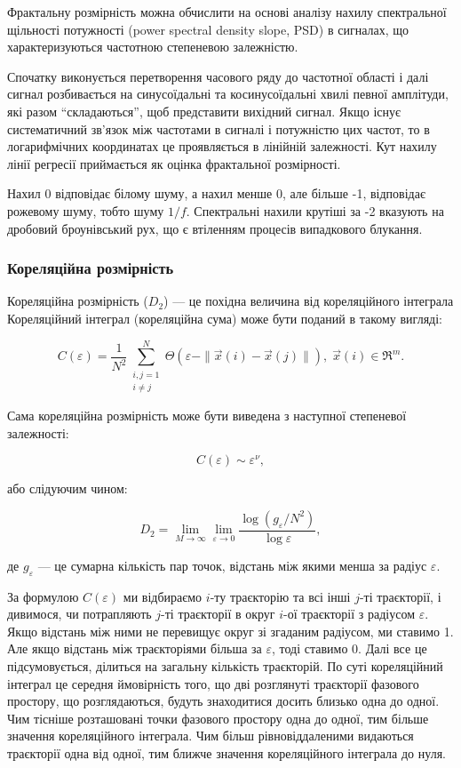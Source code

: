 \documentclass[
  letterpaper,
]{report}
\begin{document}
Фрактальну розмірність можна обчислити на основі аналізу нахилу
спектральної щільності потужності (power spectral density slope, PSD) в
сигналах, що характеризуються частотною степеневою залежністю.

Спочатку виконується перетворення часового ряду до частотної області і
далі сигнал розбивається на синусоїдальні та косинусоїдальні хвилі
певної амплітуди, які разом ``складаються'', щоб представити вихідний
сигнал. Якщо існує систематичний зв'язок між частотами в сигналі і
потужністю цих частот, то в логарифмічних координатах це проявляється в
лінійній залежності. Кут нахилу лінії регресії приймається як оцінка
фрактальної розмірності.

Нахил 0 відповідає білому шуму, а нахил менше 0, але більше -1,
відповідає рожевому шуму, тобто шуму \(1/f\). Спектральні нахили крутіші
за -2 вказують на дробовий броунівський рух, що є втіленням процесів
випадкового блукання.

\hypertarget{ux43aux43eux440ux435ux43bux44fux446ux456ux439ux43dux430-ux440ux43eux437ux43cux456ux440ux43dux456ux441ux442ux44c}{%
\subsubsection{Кореляційна
розмірність}\label{ux43aux43eux440ux435ux43bux44fux446ux456ux439ux43dux430-ux440ux43eux437ux43cux456ux440ux43dux456ux441ux442ux44c}}

Кореляційна розмірність (\(D_2\)) --- це похідна величина від
кореляційного інтеграла Кореляційний інтеграл (кореляційна сума) може
бути поданий в такому вигляді:

\[
C(\varepsilon) = \frac{1}{N^{2}}\sum_{\substack{i,j=1 \\ i\neq j}}^{N}\Theta \left( \varepsilon - \| \vec{x}(i) - \vec{x}(j) \| \right), \; \vec{x}(i) \in \Re^{m}. 
\]

Сама кореляційна розмірність може бути виведена з наступної степеневої
залежності:

\[
C(\varepsilon) \sim \varepsilon^{\nu}, 
\]

або слідуючим чином:

\[
D_2 = \lim_{M\to\infty}\lim_{\varepsilon\to 0}\frac{\log{\left( g_{\varepsilon}/N^2 \right)}}{\log{\varepsilon}}, 
\]

де \(g_{\varepsilon}\) --- це сумарна кількість пар точок, відстань між
якими менша за радіус \(\varepsilon\).

За формулою \(C(\varepsilon)\) ми відбираємо \(i\)-ту траєкторію та всі
інші \(j\)-ті траєкторії, і дивимося, чи потрапляють \(j\)-ті траєкторії
в округ \(i\)-ої траєкторії з радіусом \(\varepsilon\). Якщо відстань
між ними не перевищує округ зі згаданим радіусом, ми ставимо 1. Але якщо
відстань між траєкторіями більша за \(\varepsilon\), тоді ставимо 0.
Далі все це підсумовується, ділиться на загальну кількість траєкторій.
По суті кореляційний інтеграл це середня ймовірність того, що дві
розглянуті траєкторії фазового простору, що розглядаються, будуть
знаходитися досить близько одна до одної. Чим тісніше розташовані точки
фазового простору одна до одної, тим більше значення кореляційного
інтеграла. Чим більш рівновіддаленими видаються траєкторії одна від
одної, тим ближче значення кореляційного інтеграла до нуля.
\end{document}
